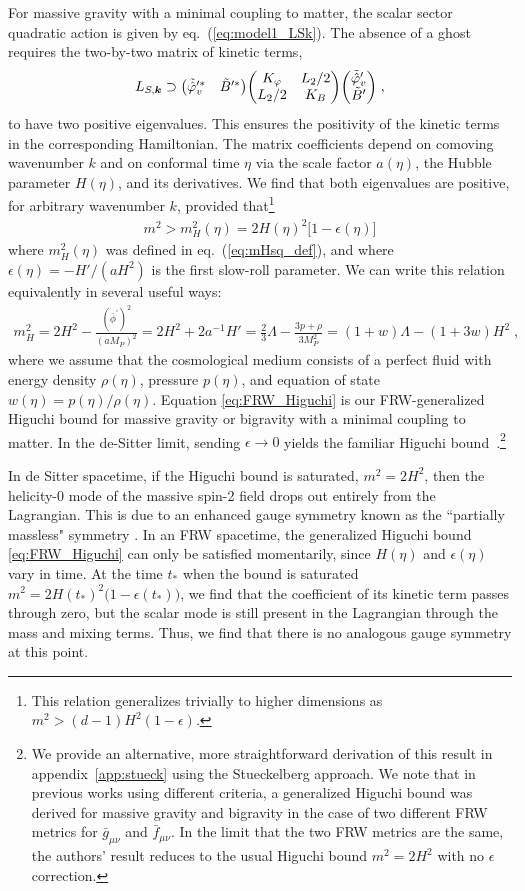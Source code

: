 \documentclass[11pt,a4paper]{article}
\newcommand{\ba}[1]{\begin{align} #1 \end{align}}
\newcommand{\kvec}{{\bm k}}
\newcommand{\Mpl}{M_P}
\newcommand{\aref}[1]{appendix~\ref{#1}}
\newcommand{\eref}[1]{eq.~(\ref{#1})}
\begin{document}
For massive gravity with a minimal coupling to matter, the scalar sector quadratic action is given by \eref{eq:model1_LSk}.  The absence of a ghost requires the two-by-two matrix of kinetic terms, 
\ba{
    L_{S,\kvec} \supset \mqty( \tilde{\hat{\varphi}}_v^{\prime \ast} & \tilde{B}^{\prime \ast} ) \mqty(K_{\varphi} & L_2 / 2 \\ L_2 / 2 & K_B) \mqty( \tilde{\hat{\varphi}}_v^\prime \\ \tilde{B}^\prime )
    \;,
}
to have two positive eigenvalues.  This ensures the positivity of the kinetic terms in the corresponding Hamiltonian.  The matrix coefficients depend on comoving wavenumber $k$ and on conformal time $\eta$ via the scale factor $a(\eta)$, the Hubble parameter $H(\eta)$, and its derivatives.  We find that both eigenvalues are positive, for arbitrary wavenumber $k$, provided that\footnote{This relation generalizes trivially to higher dimensions as $m^2 > (d-1)H^2 (1 - \epsilon)$.} 
\ba{\label{eq:FRW_Higuchi}
    m^2 > m_H^2(\eta) = 2 H(\eta)^2 \bigl[ 1 - \epsilon(\eta) \bigr] 
}
where $m_H^2(\eta)$ was defined in \eref{eq:mHsq_def}, and where $\epsilon(\eta) = - H' / (a H^2)$ is the first slow-roll parameter.  We can write this relation equivalently in several useful ways:
\ba{
    m_H^2 
    = 2 H^2 - \frac{(\bar{\phi}^\prime)^2}{(a \Mpl)^2} 
    = 2 H^2 + 2 a^{-1} H'
    = \frac23 \Lambda - \frac{3p + \rho}{3\Mpl^2}
    = (1 + w) \Lambda - (1 + 3 w) H^2
    \;,
}
where we assume that the cosmological medium consists of a perfect fluid with energy density $\rho(\eta)$, pressure $p(\eta)$, and equation of state $w(\eta) = p(\eta)/\rho(\eta)$. Equation \eqref{eq:FRW_Higuchi} is our FRW-generalized Higuchi bound for massive gravity or bigravity with a minimal coupling to matter. In the de-Sitter limit, sending $\epsilon \to 0$ yields the familiar Higuchi bound~\cite{Higuchi:1986py}.\footnote{We provide an alternative, more straightforward derivation of this result in \aref{app:stueck} using the Stueckelberg approach.  We note that in previous works \cite{Fasiello:2012rw,Fasiello:2013woa} using different criteria, a generalized Higuchi bound was derived for massive gravity and bigravity in the case of two different FRW metrics for $\bar{g}_{\mu\nu}$ and $\bar{f}_{\mu\nu}$.  In the limit that the two FRW metrics are the same, the authors' result reduces to the usual Higuchi bound $m^2 = 2H^2$ with no $\epsilon$ correction.  }

In de Sitter spacetime, if the Higuchi bound is saturated, $m^2 = 2 H^2$, then the helicity-0 mode of the massive spin-2 field drops out entirely from the Lagrangian.  This is due to an enhanced gauge symmetry known as the ``partially massless" symmetry \cite{Deser:1983mm,Deser:1983tm}.  In an FRW spacetime, the generalized Higuchi bound \eqref{eq:FRW_Higuchi} can only be satisfied momentarily, since $H(\eta)$ and $\epsilon(\eta)$ vary in time.  At the time $t_\ast$ when the bound is saturated $m^2 = 2 H(t_\ast)^2 \bigl( 1 - \epsilon(t_\ast) \bigr)$, we find that the coefficient of its kinetic term passes through zero, but the scalar mode is still present in the Lagrangian through the mass and mixing terms.  Thus, we find that there is no analogous gauge symmetry at this point.
\end{document}
